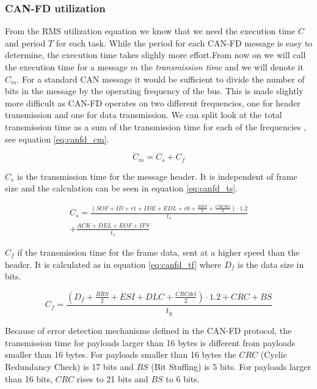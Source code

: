 
\subsubsection{CAN-FD utilization}

From the RMS utilization equation we know that we need the execution time $C$ and period $T$ for each task. While the period for each CAN-FD message is easy to determine, the execution time takes slighly more effort.From now on we will call the execution time for a message $m$ the \emph{transmission time} and we will denote it $C_m$. For a standard CAN message it would be sufficient to divide the number of bits in the message by the operating frequency of the bus. This is made slightly more difficult as CAN-FD operates on two different frequencies, one for header transmission and one for data transmission. We can split look at the total transmission time as a sum of the transmission time for each of the frequencies , see equation \ref{eq:canfd_cm}.  

\begin{equation}
    C_m=C_s+C_f
    \label{eq:canfd_cm}
\end{equation}

$C_s$ is the transmission time for the message header. It is independent of frame size and  the calculation can be seen in equation \ref{eq:canfd_ts}.

\begin{equation}
    \begin{gathered}
        C_s=\frac{(SOF+ID+r1+IDE+EDL+r0+\frac{BRS}{2}+\frac{CRCdel}{2})\cdot1.2}{t_x}\\+\frac{ACK+DEL+EOF+IFS}{t_x}
    \end{gathered}
    \label{eq:canfd_ts}
\end{equation}

$C_f$ if the transmission time for the frame data, sent at a higher speed than the header. It is calculated as in equation \ref{eq:canfd_tf} where $D_f$ is the data size in bits.

\begin{equation}
    C_f=\frac{(D_f+\frac{BRS}{2}+ESI+DLC+\frac{CRCdel}{2})\cdot1.2+CRC+BS}{t_y}
    \label{eq:canfd_tf}
\end{equation}

Because of error detection mechanisms defined in the CAN-FD protocol, the transmission time for payloads larger than 16 bytes is different from payloads smaller than 16 bytes. For payloads smaller than 16 bytes the $CRC$ (Cyclic Redundancy Check) is 17 bits and $BS$ (Bit Stuffing) is 5 bits. For payloads larger than 16 bits, $CRC$ rises to 21 bits and $BS$ to 6 bits.


